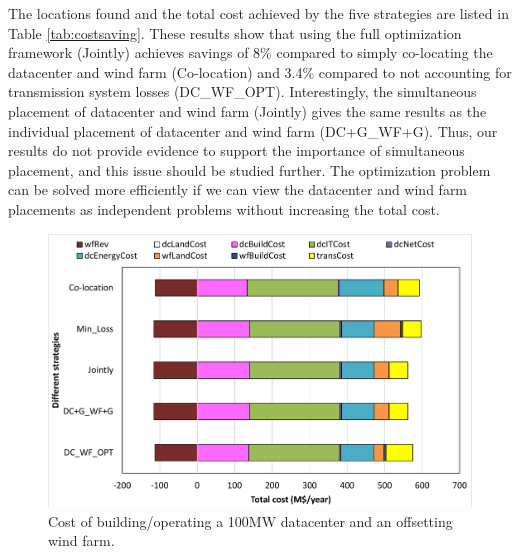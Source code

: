 The locations found and the total cost achieved by the five strategies
are listed in Table \ref{tab:costsaving}.  These results show that
using the full optimization framework (Jointly) achieves savings of
8\% compared to simply co-locating the datacenter and wind farm
(Co-location) and 3.4\% compared to not accounting for transmission
system losses (DC\_WF\_OPT).  Interestingly, the simultaneous
placement of datacenter and wind farm (Jointly) gives the same results
as the individual placement of datacenter and wind farm (DC+G\_WF+G).
Thus, our results do not provide evidence to support the importance of
simultaneous placement, and this issue should be studied further.  The
optimization problem can be solved more efficiently if we can view the
datacenter and wind farm placements as independent problems without
increasing the total cost.

\begin{figure}[ht]
\centering
\includegraphics[width=1\columnwidth]{img/cost-one-dc-one-wf}
\caption{Cost of building/operating a 100MW datacenter and an offsetting wind farm.}
\label{fig:cost1dc1wf}
\end{figure}

